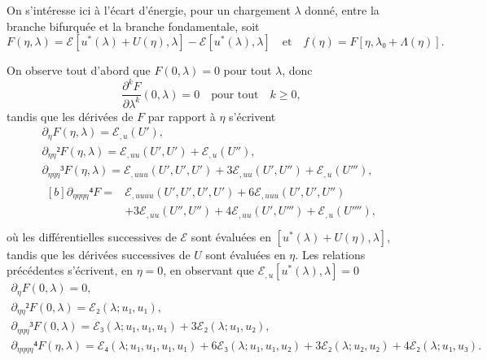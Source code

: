 \documentclass[12pt, final]{scrartcl}
\theoremstyle{definition}
\begin{document}
On s'intéresse ici à l'écart d'énergie, pour un chargement \(λ\) donné, entre la
branche bifurquée et la branche fondamentale, soit
\begin{equation}
  F(η, λ) = ℰ[u^{\ast}(λ) + U(η), λ] - ℰ[u^{\ast}(λ), λ]
  \quad \text{et} \quad
  f(η) = F [η, λ₀ + Λ(η)].
\end{equation}

On observe tout d'abord que \(F(0, λ) = 0\) pour tout \(λ\), donc
\begin{equation*}
  \frac{∂^k F}{∂ λ^k}(0, λ) = 0 \quad \text{pour tout} \quad k ≥ 0,
\end{equation*}
tandis que les dérivées de \(F\) par rapport à \(η\) s'écrivent
\begin{gather*}
  ∂_{η} F(η, λ) = ℰ_{, u}(U'),\\
  ∂_{ηη}² F(η, λ) = ℰ_{, uu} (U', U') + ℰ_{, u} (U''),\\
  ∂_{ηηη}³ F(η, λ) = ℰ_{, uuu}(U', U', U') + 3ℰ_{, uu}(U', U'') + ℰ_{, u}(U'''),\\
  \begin{aligned}[b]
    ∂_{ηηηη}⁴ F ={}
    & ℰ_{, uuuu}(U', U', U', U') + 6ℰ_{,uuu}(U', U', U'')\\
    & + 3ℰ_{, uu}(U'', U'') + 4ℰ_{, uu}(U', U''') + ℰ_{, u}(U''''),
  \end{aligned}\\
\end{gather*}
où les différentielles successives de \(ℰ\) sont évaluées en
\([u^{\ast}(λ) + U(η), λ]\), tandis que les dérivées successives de \(U\) sont
évaluées en \(η\).  Les relations précédentes s'écrivent, en \(η = 0\), en
observant que \(ℰ_{, u}[u^{\ast}(λ), λ] = 0\)
\begin{gather*}
  ∂_{η} F(0, λ) = 0,\\
  ∂_{ηη}² F(0, λ) =ℰ₂(λ ; u₁, u₁),\\
  ∂_{ηηη}³ F(0, λ) = ℰ₃(λ; u₁, u₁, u₁) + 3ℰ₂(λ; u₁, u₂),\\
  ∂_{ηηηη}⁴ F(η, λ) = ℰ₄(λ; u₁, u₁, u₁, u₁) + 6ℰ₃(λ; u₁, u₁, u₂) + 3ℰ₂(λ; u₂, u₂) + 4ℰ₂(λ; u₁, u₃).
\end{gather*}
\end{document}
